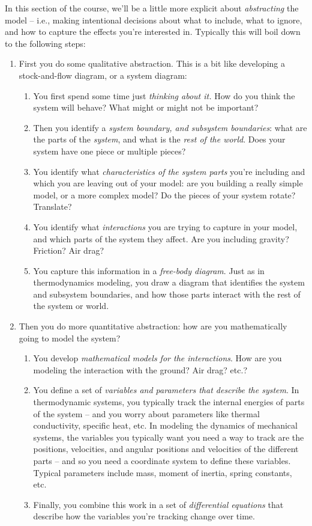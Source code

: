 \documentclass{tufte-handout}
\begin{document}
In this section of the course, we'll be a little more explicit about {\it abstracting} the model -- i.e., making intentional decisions about what to include, what to ignore,  and how to capture the effects you're interested in.  Typically this will boil down to the following steps:
\begin{enumerate}
\item First you do some qualitative abstraction.  This is a bit like developing a stock-and-flow diagram, or a system diagram:
\begin{enumerate}
\item You first spend some time just {\it thinking about it.}  How do you think the system will behave?  What might or might not be important?
\item Then you identify a {\it system boundary, and subsystem boundaries}:  what are the parts of the {\it system}, and what is the {\it rest of the world}.  Does your system have one piece or multiple pieces?  
\item You identify what {\it characteristics of the system parts} you're including and which you are leaving out of your model: are you building a really simple model, or a more complex model?  Do the pieces of your system rotate?  Translate?    
\item You identify what {\it interactions} you are trying to capture in your model, and which parts of the system they affect.  Are you including gravity?  Friction?  Air drag?
\item You capture this information in a {\it free-body diagram}.  Just as in thermodynamics modeling, you draw a diagram that identifies the system and subsystem boundaries, and how those parts interact with the rest of the system or world. 
\end{enumerate}
\item Then you do more quantitative abstraction:  how are you mathematically going to model the system?
\begin{enumerate}
 \item You develop {\it mathematical models for the interactions}.  How are you modeling the interaction with the ground?  Air drag?  etc.?
\item You define a set of {\it variables and parameters that describe the system}.  In thermodynamic systems, you typically track the internal energies of parts of the system -- and you worry about parameters like thermal conductivity, specific heat, etc.  In modeling the dynamics of mechanical systems, the variables you typically want you need a way to track are the positions, velocities, and angular positions and velocities of the different parts  -- and so you need a coordinate system to define these variables. Typical parameters include mass, moment of inertia, spring constants, etc. 
\item Finally, you combine this work in a set of {\it differential equations} that describe how the variables you're tracking change over time.
\end{enumerate}
\end{enumerate}
\end{document}
